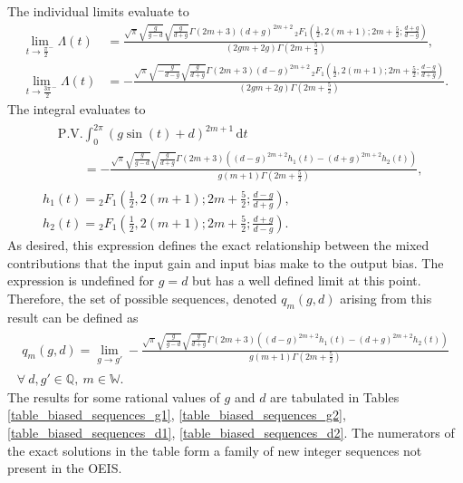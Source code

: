 The individual limits evaluate to
\begin{align}
\lim_{t\to{\frac{\pi}{2}}^{-}} \Lambda(t) &= \frac{\sqrt{\pi } \sqrt{\frac{g}{g-d}} \sqrt{\frac{g}{d+g}} \Gamma (2 m+3) (d+g)^{2 m+2} \, _2F_1\left(\frac{1}{2},2 (m+1);2 m+\frac{5}{2};\frac{d+g}{d-g}\right)}{(2 g m+2 g) \Gamma \left(2 m+\frac{5}{2}\right)}, \\
\lim_{t\to{\frac{3\pi}{2}}^{-}} \Lambda(t) &= -\frac{\sqrt{\pi } \sqrt{-\frac{g}{d-g}} \sqrt{\frac{g}{d+g}} \Gamma (2 m+3) (d-g)^{2 m+2} \, _2F_1\left(\frac{1}{2},2 (m+1);2 m+\frac{5}{2};\frac{d-g}{d+g}\right)}{(2 g m+2 g) \Gamma \left(2 m+\frac{5}{2}\right)}.
\end{align}
The integral evaluates to
\begin{gather}
\begin{align}
	&\mathrm{P.V.} \int_0^{2\pi} \! (g \sin(t) + d)^{2m+1} \, \mathrm{d}t \nonumber \\
	&\quad\quad = -\frac{\sqrt{\pi } \sqrt{\frac{g}{g-d}} \sqrt{\frac{g}{d+g}} \Gamma (2 m+3) \left((d-g)^{2 m+2} h_1(t) - (d+g)^{2 m+2}h_2(t)\right)}{g (m+1) \Gamma \left(2 m+\frac{5}{2}\right)},
\end{align} \\
h_1(t) = {}_2F_1\left(\frac{1}{2},2 (m+1);2 m+\frac{5}{2};\frac{d-g}{d+g}\right), \\
h_2(t) = {}_2F_1\left(\frac{1}{2},2 (m+1);2 m+\frac{5}{2};\frac{d+g}{d-g}\right).
\end{gather}
As desired, this expression defines the exact relationship between the mixed contributions that the input
gain and input bias make to the output bias.  The expression is undefined for $g = d$ but has a well defined
limit at this point.  Therefore, the set of possible sequences, denoted $q_m(g, d)$ arising from this result
can be defined as
\begin{gather}
\begin{align}
	q_m(g,d)
	    = \lim_{g \to g'}
	        -\frac{\sqrt{\pi } \sqrt{\frac{g}{g-d}} \sqrt{\frac{g}{d+g}} \Gamma (2 m+3) \left((d-g)^{2 m+2} h_1(t) - (d+g)^{2 m+2}h_2(t)\right)}{g (m+1) \Gamma \left(2 m+\frac{5}{2}\right)}
\end{align} \\
    \forall \ d, g' \in \mathbb{Q},\ m \in \mathbb{W} \nonumber.
\end{gather}
The results for some rational values of $g$ and $d$ are tabulated in Tables
\ref{table_biased_sequences_g1}, \ref{table_biased_sequences_g2},
\ref{table_biased_sequences_d1}, \ref{table_biased_sequences_d2}.  The numerators of the
exact solutions in the table form a family of new integer sequences not present in the OEIS.

